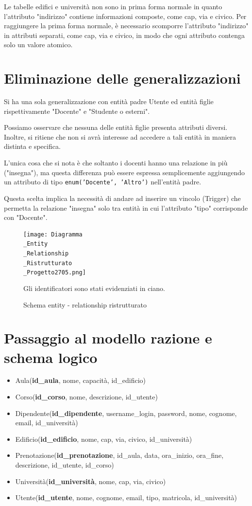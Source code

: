 \documentclass[a4paper, 10pt, oneside]{article} %
\begin{document}
Le tabelle edifici e università non sono in prima forma normale in quanto l'attributo "indirizzo" contiene informazioni composte, come cap, via e civico. Per raggiungere la prima forma normale, è necessario scomporre l'attributo "indirizzo" in attributi separati, come cap, via e civico, in modo che ogni attributo contenga solo un valore atomico.

\section{Eliminazione delle generalizzazioni}

Si ha una sola generalizzazione con entità padre Utente ed entità figlie rispettivamente "Docente" e "Studente o esterni".

Possiamo osservare che nessuna delle entità figlie presenta attributi diversi. Inoltre, si ritiene che non si avrà interesse ad accedere a tali entità in maniera distinta e specifica.

L'unica cosa che si nota è che soltanto i docenti hanno una relazione in più ("insegna"), ma questa differenza può essere espressa semplicemente aggiungendo un attributo di tipo \texttt{enum('Docente', 'Altro')} nell'entità padre.

Questa scelta implica la necessità di andare ad inserire un vincolo (Trigger) che permetta la relazione "insegna" solo tra entità in cui l'attributo "tipo" corrisponde con "Docente".


\begin{figure}[h]
  \centering
\texttt{[image: Diagramma\\\_Entity\\\_Relationship\\\_Ristrutturato\\\_Progetto2705.png]}
  \caption{Schema entity - relationship ristrutturato}
    Gli identificatori sono stati evidenziati in ciano.\\
\end{figure}
\newpage


\section{Passaggio al modello razione e schema logico}
\begin{itemize}
    \item Aula(\textbf{id\_aula}, nome, capacità, id\_edificio)
    \item Corso(\textbf{id\_corso}, nome, descrizione, id\_utente)
    \item Dipendente(\textbf{id\_dipendente}, username\_login, password, nome, cognome, email, id\_università)
    \item Edificio(\textbf{id\_edificio}, nome, cap, via, civico, id\_università)
    \item Prenotazione(\textbf{id\_prenotazione}, id\_aula, data, ora\_inizio, ora\_fine, descrizione, id\_utente, id\_corso)
    \item Università(\textbf{id\_università}, nome, cap, via, civico)
    \item Utente(\textbf{id\_utente}, nome, cognome, email, tipo, matricola, id\_università)
\end{itemize}
\end{document}
